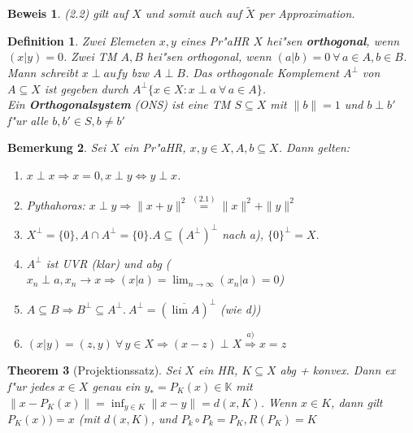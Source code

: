 \documentclass[a4paper,11pt]{book}
\newcommand{\K}{{\mathbb K}}
\newcommand{\begriff}[1]{\textbf{#1}} %
\newtheorem{Def}{Definition}[chapter]
\newtheorem{Theo}[Def]{Theorem}
\newtheorem{Bem}[Def]{Bemerkung}
\theoremstyle{nonumberplain}
\newtheorem{Bew}{Beweis}
\begin{document}
\begin{Bew}
(2.2) gilt auf $X$ und somit auch auf $\tilde{X}$ per Approximation.
\end{Bew}

\begin{Def}
Zwei Elemeten $x,y$ eines Pr"aHR $X$ hei"sen \begriff{orthogonal}, wenn $(x|y) = 0$. Zwei TM $A,B$ hei"sen orthogonal, wenn $(a|b) = 0 \ \forall\, a \in A, b \in B$. Mann schreibt $x \perp auf y$ bzw $A \perp B$. Das orthogonale Komplement $A^{\perp}$ von $A \subseteq X$ ist gegeben durch $A^{\perp} \{ x \in X: x \perp a \ \forall\, a \in A \}$.\\
Ein \begriff{Orthogonalsystem} (ONS) ist eine TM $S \subseteq X$ mit $\|b\| = 1$ und $b \perp b'$ f"ur alle $b,b' \in S, b \not= b'$
\end{Def}

\begin{Bem}
Sei $X$ ein Pr"aHR, $x,y \in X, A,b \subseteq X$. Dann gelten:
\begin{enumerate}
\item $x \perp x \Rightarrow x = 0, x \perp y \Leftrightarrow y \perp x$.

\item Pythahoras: $x \perp y \Rightarrow \|x+y\|^2 \stackrel{(2.1)}{=} \|x\|^2 + \|y\|^2$

\item $X^{\perp} = \{0\}, A \cap A^{\perp} = \{0\}. A \subseteq (A^{\perp})^{\perp}$ nach a), $\{0\}^{\perp} = X.$

\item $A^{\perp}$ ist UVR (klar) und abg ($x_n \perp a, x_n \rightarrow x \Rightarrow (x|a) = \lim_{n \rightarrow \infty} (x_n|a) = 0$)

\item $A \subseteq B \Rightarrow B^{\perp} \subseteq A^{\perp}.\ A^{\perp} = (\overline{\lim A})^{\perp}$ (wie d))

\item $(x|y) = (z,y) \ \forall\, y \in X \Rightarrow (x-z) \perp X \stackrel{a)}{\Rightarrow} x = z$
\end{enumerate}
\end{Bem}

\begin{Theo}[Projektionssatz]
Sei $X$ ein HR, $K \subseteq X$ abg + konvex. Dann ex f"ur jedes $x \in X$ genau ein $y_{\ast} = P_K(x) \in \K$ mit $\| x - P_K(x) \| = \inf_{y \in K} \|x-y\| = d(x,K)$. Wenn $x \in K$, dann gilt $P_K(x) ) = x$ (mit $d(x,K)$, und $P_k \circ P_k = P_K, R(P_K) = K$
\end{Theo}
\end{document}
